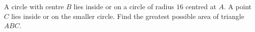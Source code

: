 A circle with centre $B$ lies inside or on a circle of radius $16$ centred at $A$. A point $C$ lies inside or on the smaller circle. Find the greatest possible area of triangle $ABC$.
